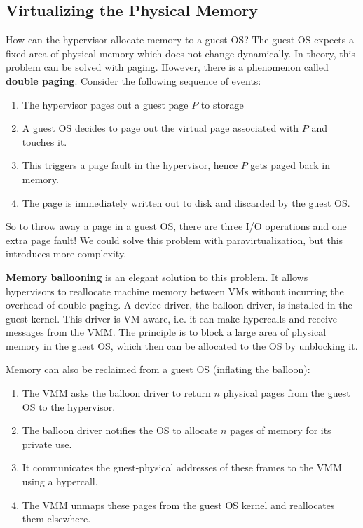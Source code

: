 \subsection{Virtualizing the Physical Memory}

How can the hypervisor allocate memory to a guest OS? The guest OS expects a fixed area of physical memory which does not change dynamically. In theory, this problem can be solved with paging. However, there is a phenomenon called \textbf{double paging}. Consider the following sequence of events:
\begin{enumerate}
	\item The hypervisor pages out a guest page $P$ to storage
	\item A guest OS decides to page out the virtual page associated with $P$ and touches it.
	\item This triggers a page fault in the hypervisor, hence $P$ gets paged back in memory.
	\item The page is immediately written out to disk and discarded by the guest OS.
\end{enumerate}
So to throw away a page in a guest OS, there are three I/O operations and one extra page fault! We could solve this problem with paravirtualization, but this introduces more complexity. \medskip

\textbf{Memory ballooning} is an elegant solution to this problem. It allows hypervisors to reallocate machine memory between VMs without incurring the overhead of double paging. A  device driver, the balloon driver, is installed in the guest kernel. This driver is VM-aware, i.e. it can make hypercalls and receive messages from the VMM. The principle is to block a large area of physical memory in the guest OS, which then can be allocated to the OS by unblocking it. \medskip

Memory can also be reclaimed from a guest OS (inflating the balloon):
\begin{enumerate}
	\item The VMM asks the balloon driver to return $n$ physical pages from the guest OS to the hypervisor.
	\item The balloon driver notifies the OS to allocate $n$ pages of memory for its private use.
	\item It communicates the guest-physical addresses of these frames to the VMM using a hypercall.
	\item The VMM unmaps these pages from the guest OS kernel and reallocates them elsewhere.
\end{enumerate}

